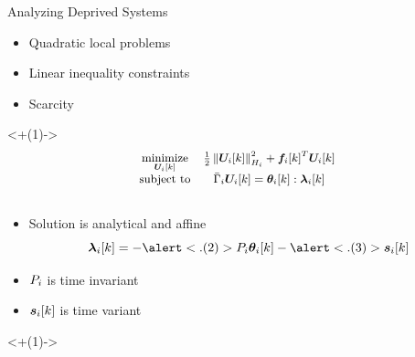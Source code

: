 \documentclass[handout,aspectratio=169]{beamer}
\begin{document}
\begin{frame}{Analyzing Deprived Systems}
  \begin{minipage}[t]{.45\textwidth}
    \begin{assumptions}
      \begin{itemize}[<+(1)->]
        \item Quadratic local problems
        \item Linear inequality constraints
        \item Scarcity
      \end{itemize}
    \end{assumptions}
  \end{minipage}
  \hfill
  \begin{minipage}[t]{0.45\textwidth}
    \centering
    \onslide<+(1)->{
      \begin{equation*}
        \small
        \begin{matrix}
          {\minimize\limits_{\vec{U}_{i}[k]}}&{\frac{1}{2}\norm{\vec{U}_{i}[k]}^{2}_{H_{i}} + {\vec{f}_{i}[k]}^{T}\vec{U}_{i}[k]}\\
          \mathrm{subject~ to} & \bar{\Gamma}_{i}\vec{U}_{i}[k] = \thetaik:\lambdaik \\
                                             &\\
        \end{matrix}
      \end{equation*}
    }
  \end{minipage}

  \begin{itemize}[<+(1)->]
    \item Solution is analytical and affine
          \begin{equation*}
            \lambdaik=-\alert<.(2)>{\Plin}\thetaik-\alert<.(3)>{\sik}
          \end{equation*}
  \end{itemize}

  \vspace{-.5cm}
  \hfill
  \begin{minipage}[t]{.45\linewidth}
    \begin{itemize}[<+(1)->]
      \item ${P}_{i}$ is time invariant 
      \item $\boldsymbol{s}_{i}[k]$ is time variant
    \end{itemize}
  \end{minipage}
  \onslide<+(1)->{
  }
\end{frame}
\end{document}
